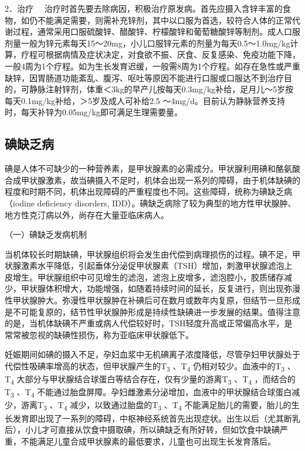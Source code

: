 {2．治疗}
　治疗时首先要去除病因，积极治疗原发病。首先应摄入含锌丰富的食物，如仍不能满足需要，则需补充锌剂，其中以口服为首选，较符合人体的正常代谢过程，通常采用口服硫酸锌、醋酸锌、柠檬酸锌和葡萄糖酸锌等制剂。成人口服剂量一般为锌元素每天15～20mg，小儿口服锌元素的剂量为每天0.5～1.0mg/kg计算，疗程可根据病情及症状决定，对食欲不振、厌食、反复感染、免疫功能下降，一般4周为1个疗程。如为生长发育迟缓，一般需8周为1个疗程。如存在急性或严重缺锌，因胃肠道功能紊乱、腹泻、呕吐等原因不能进行口服或口服达不到治疗目的，可静脉注射锌剂，体重＜3kg的早产儿按每天0.3mg/kg补给，足月儿～5岁按每天0.1mg/kg补给，＞5岁及成人可补给2.5
～4mg/d。目前认为静脉营养支持时，每天补锌为0.05mg/kg即可满足生理需要量。

\hypertarget{text00003.htmlux5cux23mllj24}{%
\subsection{碘缺乏病}\label{text00003.htmlux5cux23mllj24}}

碘是人体不可缺少的一种营养素，是甲状腺素的必需成分。甲状腺利用碘和酪氨酸合成甲状腺激素，故当碘摄入不足时，机体会出现一系列的障碍，由于机体缺碘的程度和时期不同，机体出现障碍的严重程度也不同。这些障碍，统称为碘缺乏病（iodine
deficiency disorders,
IDD）。碘缺乏病除了较为典型的地方性甲状腺肿、地方性克汀病以外，尚存在大量亚临床病人。

（一）碘缺乏发病机制

当机体较长时期缺碘，甲状腺组织将会发生由代偿到病理损伤的过程。碘不足，甲状腺激素水平降低，引起垂体分泌促甲状腺素（TSH）增加，刺激甲状腺滤泡上皮增生。甲状腺组织中可见增生的滤泡，滤泡上皮增多，滤泡腔小，胶质储存减少，甲状腺体积增大，功能增强，如随着持续时间的延长，反复进行，则出现弥漫性甲状腺肿大。弥漫性甲状腺肿在补碘后可在数月或数年内复原，但结节一旦形成是不可能复原的，结节性甲状腺肿形成是持续性缺碘进一步发展的结果。值得注意的是，当机体缺碘不严重或病人代偿较好时，TSH轻度升高或正常偏高水平，是常常被忽视的缺碘性损伤，称为亚临床甲状腺低下。

妊娠期间如碘的摄入不足，孕妇血浆中无机碘离子浓度降低，尽管孕妇甲状腺处于代偿性吸碘率增高的状态，但甲状腺产生的T\textsubscript{3}
、T\textsubscript{4} 仍相对较少。血液中的T\textsubscript{3}
、T\textsubscript{4}
大部分与甲状腺结合球蛋白等结合存在，仅有少量的游离T\textsubscript{3}
、T\textsubscript{4} ，而结合的T\textsubscript{3} 、T\textsubscript{4}
不能通过胎盘屏障。孕妇雌激素分泌增加，血液中的甲状腺结合球蛋白减少，游离T\textsubscript{3}
、T\textsubscript{4} 减少，以致通过胎盘的T\textsubscript{3}
、T\textsubscript{4}
不能满足胎儿的需要，胎儿的生长发育即出现了一系列的障碍，中枢神经系统首先出现症状。出生以后（尤其断乳后），小儿才可直接从饮食中摄取碘，所以碘缺乏有所好转，但如饮食中缺碘严重，不能满足儿童合成甲状腺素的最低要求，儿童也可出现生长发育落后。

